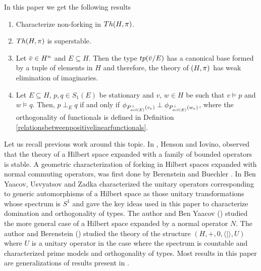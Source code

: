 \documentclass{amsart}
\def\ben{\begin{enumerate}}\def\een{\end{enumerate}}
\theoremstyle{definition}
\theoremstyle{remark}
\newcommand{\Z}{\ensuremath{\mathbb{Z}}}
\begin{document}
In this paper we get the following results

\ben
\item Characterize non-forking in $Th(H,\pi)$.
\item $Th(H,\pi)$ is superstable.
\item Let $\bar v\in H^n$ and $E\subseteq H$. Then the type $tp(\bar v/E)$ has a canonical base formed by a tuple of elements in $H$ and therefore, the theory of $(H,\pi)$ has weak elimination of imaginaries.
\item Let $E\subseteq H$, $p,q\in S_1(E)$ be stationary and $v$, $w\in H$ be such that $v\models p$ and $w\models q$. Then, $p\perp_E q$ if and only if $\phi_{P^\perp_{acl(E)}(v_e)}\perp \phi_{P^\perp_{acl(E)}(w_e)}$, where the orthogonality of functionals is defined in Definition \ref{relationsbetweenpositivelinearfunctionals}.
\een

Let us recall previous work around this topic. In \cite{Io}, Henson and Iovino,  observed that the theory of a Hilbert space expanded with a family of bounded operators is stable. A geometric characterization of forking in Hilbert spaces expanded with normal commuting operators, was first done by Berenstein and Buechler \cite{BeBue}. In \cite{BUZ} Ben Yaacov, Usvyatsov and Zadka characterized the unitary operators corresponding to generic automorphisms of a Hilbert space as those unitary transformations whose spectrum is $S^1$ and gave the key ideas used in this paper to characterize domination and orthogonality of types. The author and Ben Yaacov (\cite{ArBen}) studied the more general case of a Hilbert space expanded by a normal operator $N$. The author and Berenstein (\cite{ArBer}) studied the theory of the structure $(H,+,0,\langle|\rangle,U)$ where $U$ is a unitary operator in the case where the spectrum is countable and characterized prime models and orthogonality of types.  Most results in this paper are generalizations of results present in \cite{ArBer,ArBen}.   

\end{document}
